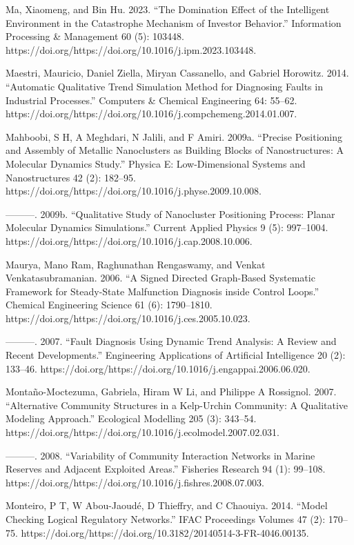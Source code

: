 \documentclass[utf8]{gradu3}
\begin{document}
Ma, Xiaomeng, and Bin Hu. 2023. “The Domination Effect of the Intelligent Environment in the Catastrophe Mechanism of Investor Behavior.” Information Processing \& Management 60 (5): 103448. https://doi.org/https://doi.org/10.1016/j.ipm.2023.103448.

Maestri, Mauricio, Daniel Ziella, Miryan Cassanello, and Gabriel Horowitz. 2014. “Automatic Qualitative Trend Simulation Method for Diagnosing Faults in Industrial Processes.” Computers \& Chemical Engineering 64: 55–62. https://doi.org/https://doi.org/10.1016/j.compchemeng.2014.01.007.

Mahboobi, S H, A Meghdari, N Jalili, and F Amiri. 2009a. “Precise Positioning and Assembly of Metallic Nanoclusters as Building Blocks of Nanostructures: A Molecular Dynamics Study.” Physica E: Low-Dimensional Systems and Nanostructures 42 (2): 182–95. https://doi.org/https://doi.org/10.1016/j.physe.2009.10.008.

———. 2009b. “Qualitative Study of Nanocluster Positioning Process: Planar Molecular Dynamics Simulations.” Current Applied Physics 9 (5): 997–1004. https://doi.org/https://doi.org/10.1016/j.cap.2008.10.006.

Maurya, Mano Ram, Raghunathan Rengaswamy, and Venkat Venkatasubramanian. 2006. “A Signed Directed Graph-Based Systematic Framework for Steady-State Malfunction Diagnosis inside Control Loops.” Chemical Engineering Science 61 (6): 1790–1810. https://doi.org/https://doi.org/10.1016/j.ces.2005.10.023.

———. 2007. “Fault Diagnosis Using Dynamic Trend Analysis: A Review and Recent Developments.” Engineering Applications of Artificial Intelligence 20 (2): 133–46. https://doi.org/https://doi.org/10.1016/j.engappai.2006.06.020.

Montaño-Moctezuma, Gabriela, Hiram W Li, and Philippe A Rossignol. 2007. “Alternative Community Structures in a Kelp-Urchin Community: A Qualitative Modeling Approach.” Ecological Modelling 205 (3): 343–54. https://doi.org/https://doi.org/10.1016/j.ecolmodel.2007.02.031.

———. 2008. “Variability of Community Interaction Networks in Marine Reserves and Adjacent Exploited Areas.” Fisheries Research 94 (1): 99–108. https://doi.org/https://doi.org/10.1016/j.fishres.2008.07.003.

Monteiro, P T, W Abou-Jaoudé, D Thieffry, and C Chaouiya. 2014. “Model Checking Logical Regulatory Networks.” IFAC Proceedings Volumes 47 (2): 170–75. https://doi.org/https://doi.org/10.3182/20140514-3-FR-4046.00135.
\end{document}
